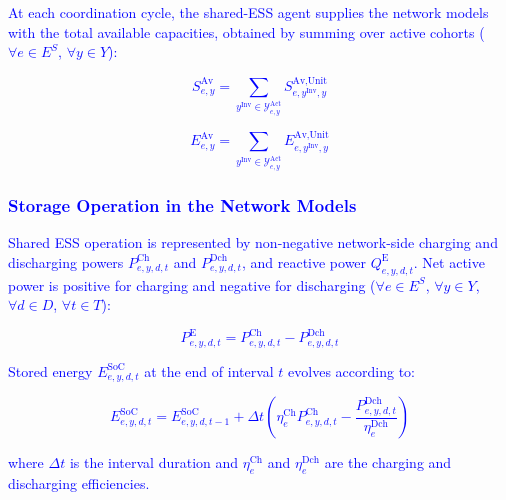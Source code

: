 \documentclass[preprint,12pt]{elsarticle}
\begin{document}
\textcolor{blue}{
    At each coordination cycle, the shared-ESS agent supplies the network models with the total available capacities, obtained by summing over active cohorts ($\forall e\in E^S$, $\forall y\in Y$):
}

\textcolor{blue}{
    \begin{equation}
        S^{\text{Av}}_{e,y} = \sum_{y^{\text{Inv}}\in\mathcal{Y}^{\text{Act}}_{e,y}} S^{\text{Av,Unit}}_{e,y^{\text{Inv}},y}
        \label{eq:available_power}
    \end{equation}
}

\textcolor{blue}{
    \begin{equation}
        E^{\text{Av}}_{e,y} = \sum_{y^{\text{Inv}}\in\mathcal{Y}^{\text{Act}}_{e,y}} E^{\text{Av,Unit}}_{e,y^{\text{Inv}},y}
        \label{eq:available_capacity}
    \end{equation}
}

\subsubsection{\textcolor{blue}{Storage Operation in the Network Models}}
\label{subsubsec:network_storage}

\textcolor{blue}{
    Shared ESS operation is represented by non-negative network-side charging and discharging powers $P^{\text{Ch}}_{e,y,d,t}$ and $P^{\text{Dch}}_{e,y,d,t}$, and reactive power $Q^{\text{E}}_{e,y,d,t}$. Net active power is positive for charging and negative for discharging ($\forall e\in E^S$, $\forall y\in Y$, $\forall d\in D$, $\forall t\in T$):
}

\textcolor{blue}{
    \begin{equation}
        P^{\text{E}}_{e,y,d,t}
        =
        P^{\text{Ch}}_{e,y,d,t}
        -
        P^{\text{Dch}}_{e,y,d,t}
        \label{eq:storage_net_active_power}
    \end{equation}
}

\textcolor{blue}{
    Stored energy $E^{\text{SoC}}_{e,y,d,t}$ at the end of interval $t$ evolves according to:
}

\textcolor{blue}{
    \begin{equation}
        E^{\text{SoC}}_{e,y,d,t} = E^{\text{SoC}}_{e,y,d,t-1}
        + \Delta t \left( \eta^{\text{Ch}}_e P^{\text{Ch}}_{e,y,d,t} - \frac{P^{\text{Dch}}_{e,y,d,t}}{\eta^{\text{Dch}}_e} \right)
        \label{eq:soc_recursion}
    \end{equation}
}

\noindent
\textcolor{blue}{
    where $\Delta t$ is the interval duration and $\eta^{\text{Ch}}_e$ and $\eta^{\text{Dch}}_e$ are the charging and discharging efficiencies.
}
\end{document}
